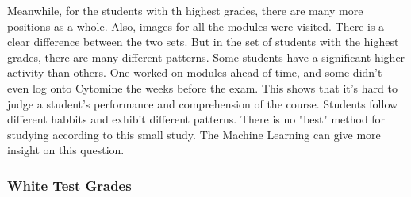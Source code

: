 \documentclass[a4paper,11pt]{report}
\numberwithin{figure}{section} %
\begin{document}
    Meanwhile, for the students with th highest grades, there are many more positions as a whole.
    Also, images for all the modules were visited.
    There is a clear difference between the two sets.
    But in the set of students with the highest grades, there are many different patterns.
    Some students have a significant higher activity than others.
    One worked on modules ahead of time, and some didn't even log onto Cytomine the weeks before the exam.
    This shows that it's hard to judge a student's performance and comprehension of the course.
    Students follow different habbits and exhibit different patterns.
    There is no "best" method for studying according to this small study.
    The Machine Learning can give more insight on this question.



    \subsubsection{White Test Grades}
    
\end{document}
